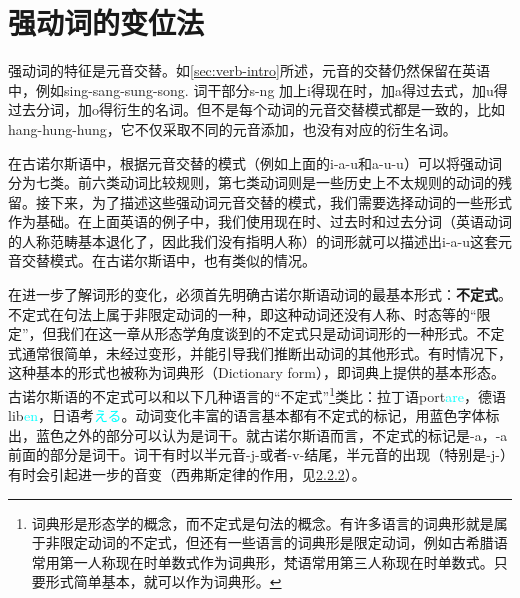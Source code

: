 \section{强动词的变位法}
强动词的特征是元音交替。如\ref{sec:verb-intro}所述，元音的交替仍然保留在英语中，例如sing-sang-sung-song. 词干部分s-ng 加上i得现在时，加a得过去式，加u得过去分词，加o得衍生的名词。但不是每个动词的元音交替模式都是一致的，比如hang-hung-hung，它不仅采取不同的元音添加，也没有对应的衍生名词。

在古诺尔斯语中，根据元音交替的模式（例如上面的i-a-u和a-u-u）可以将强动词分为七类。前六类动词比较规则，第七类动词则是一些历史上不太规则的动词的残留。接下来，为了描述这些强动词元音交替的模式，我们需要选择动词的一些形式作为基础。在上面英语的例子中，我们使用现在时、过去时和过去分词（英语动词的人称范畴基本退化了，因此我们没有指明人称）的词形就可以描述出i-a-u这套元音交替模式。在古诺尔斯语中，也有类似的情况。

在进一步了解词形的变化，必须首先明确古诺尔斯语动词的最基本形式：\textbf{不定式}。不定式在句法上属于非限定动词的一种，即这种动词还没有人称、时态等的“限定”，但我们在这一章从形态学角度谈到的不定式只是动词词形的一种形式。不定式通常很简单，未经过变形，并能引导我们推断出动词的其他形式。有时情况下，这种基本的形式也被称为词典形（Dictionary form），即词典上提供的基本形态。古诺尔斯语的不定式可以和以下几种语言的``不定式''\footnote{词典形是形态学的概念，而不定式是句法的概念。有许多语言的词典形就是属于非限定动词的不定式，但还有一些语言的词典形是限定动词，例如古希腊语常用第一人称现在时单数式作为词典形，梵语常用第三人称现在时单数式。只要形式简单基本，就可以作为词典形。}类比：拉丁语port\textcolor{cyan}{are}，德语lib\textcolor{cyan}{en}，日语考\textcolor{cyan}{える}。动词变化丰富的语言基本都有不定式的标记，用蓝色字体标出，蓝色之外的部分可以认为是词干。就古诺尔斯语而言，不定式的标记是-a，-a前面的部分是词干。词干有时以半元音-j-或者-v-结尾，半元音的出现（特别是-j-）有时会引起进一步的音变（西弗斯定律的作用，见\hyperref[ajawa-ux8bcdux5e72]{2.2.2}）。


